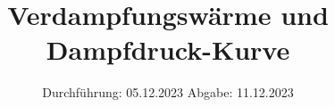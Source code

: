 
\usepackage{longtable}

\subject{V203}
\title{Verdampfungswärme und Dampfdruck-Kurve}
\date{%
  Durchführung: 05.12.2023
  \hspace{3em}
  Abgabe: 11.12.2023
}



\maketitle
\thispagestyle{empty}
\tableofcontents
\newpage






\printbibliography{}
\appendix
\setcounter{secnumdepth}{0}

